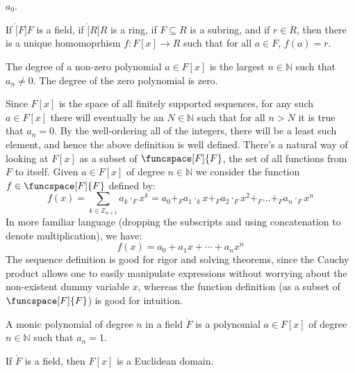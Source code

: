 \documentclass{article}                                                        %
\begin{document}
        $a_{0}$.
        \begin{theorem}
            If $\ring[F]{F}$ is a field, if $\ring[R]{R}$ is a ring, if
            $F\subseteq{R}$ is a subring, and if $r\in{R}$, then there is a
            unique homomoprhism $f:F[x]\rightarrow{R}$ such that for all
            $a\in{F}$, $f(a)=r$.
        \end{theorem}
        \begin{definition}
            The degree of a non-zero polynomial $a\in{F}[x]$ is the largest
            $n\in\mathbb{N}$ such that $a_{n}\ne{0}$. The degree of the zero
            polynomial is zero.
        \end{definition}
        Since $F[x]$ is the space of all finitely supported sequences, for any
        such $a\in{F}[x]$ there will eventually be an $N\in\mathbb{N}$ such that
        for all $n>N$ it is true that $a_{n}=0$. By the well-ordering all of the
        integers, there will be a least such element, and hence the above
        definition is well defined. There's a natural way of looking at
        $F[x]$ as a subset of $\funcspace[F]{F}$, the set of all functions from
        $F$ to itself. Given $a\in{F}[x]$ of degree $n\in\mathbb{N}$ we consider
        the function $f\in\funcspace[F]{F}$ defined by:
        \begin{equation}
            f(x)=\sum_{k\in\mathbb{Z}_{n+1}}a_{k}\cdot_{F}x^{k}
            =a_{0}+_{F}a_{1}\cdot_{k}x+_{F}a_{2}\cdot_{F}x^{2}+_{F}\dots
            +_{F}a_{n}\cdot_{F}x^{n}
        \end{equation}
        In more familiar language (dropping the subscripts and using
        concatenation to denote multiplication), we have:
        \begin{equation}
            f(x)=a_{0}+a_{1}x+\cdots+a_{n}x^{n}
        \end{equation}
        The sequence definition is good for rigor and solving theorems, since
        the Cauchy product allows one to easily manipulate expressions without
        worrying about the non-existent dummy variable $x$, whereas the function
        definition (as a subset of $\funcspace[F]{F}$) is good for intuition.
        \begin{definition}
            A monic polynomial of degree $n$ in a field $\ring{F}$ is a
            polynomial $a\in{F}[x]$ of degree $n\in\mathbb{N}$ such that
            $a_{n}=1$.
        \end{definition} 
        \begin{theorem}
            If $\ring{F}$ is a field, then $F[x]$ is a Euclidean domain.
        \end{theorem}
\end{document}
